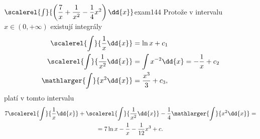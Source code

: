 \begin{mathexam}{\(\protect\scalerel{\int}{\left(\dfrac{7}{x}+ \dfrac{1}{x^2} -
    \dfrac{1}{4}x^2\right)\dd{x}}\)}{exam144} 
    Protože v intervalu \(x\in(0, +\infty)\) existují integrály
    \begin{align*}
      \scalerel{\int}{\dfrac{1}{x}\dd{x}}   &= \ln x + c_1  \\
      \scalerel{\int}{\dfrac{1}{x^2}\dd{x}} &= \int x^{-2}\dd{x} = -\dfrac{1}{x} + c_2  \\
      \mathlarger{\int}{x^2\dd{x}}            &= \dfrac{x^3}{3} + c_3 ,
    \end{align*}  
    platí v tomto intervalu
    \begin{multline*}
                    7\scalerel{\int}{\dfrac{1}{x}\dd{x}}   + 
                     \scalerel{\int}{\dfrac{1}{x^2}\dd{x}} - 
       \dfrac{1}{4}\mathlarger{\int}{x^2\dd{x}} =                   \\
         = 7\ln x - \dfrac{1}{x} - \dfrac{1}{12}x^3 + c.
    \end{multline*}
\end{mathexam}